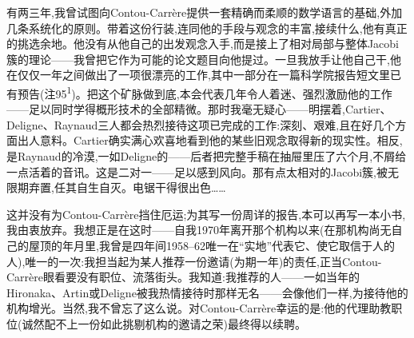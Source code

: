 有两三年,我曾试图向Contou-Carrère提供一套精确而柔顺的数学语言的基础,外加几条系统化的原则。带着这份行装,连同他的手段与观念的丰富,接续什么,他有真正的挑选余地。他没有从他自己的出发观念入手,而是接上了相对局部与整体Jacobi簇的理论——我曾把它作为可能的论文题目向他提过。一旦我放手让他自己干,他在仅仅一年之间做出了一项很漂亮的工作,其中一部分在一篇科学院报告短文里已有预告(注95\textsuperscript{1})。把这个矿脉做到底,本会代表几年令人着迷、强烈激励他的工作——足以同时学得概形技术的全部精微。那时我毫无疑心——明摆着,Cartier、Deligne、Raynaud三人都会热烈接待这项已完成的工作:深刻、艰难,且在好几个方面出人意料。Cartier确实满心欢喜地看到他的某些旧观念取得新的现实性。相反,是Raynaud的冷漠,一如Deligne的——后者把完整手稿在抽屉里压了六个月,不屑给一点活着的音讯。这是二对一——足以感到风向。那有点太相对的Jacobi簇,被无限期弃置,任其自生自灭。电锯干得很出色……

这并没有为Contou-Carrère挡住厄运;为其写一份周详的报告,本可以再写一本小书,我由衷放弃。我想正是在这时——自我1970年离开那个机构以来(在那机构尚无自己的屋顶的年月里,我曾是四年间1958--62唯一在“实地”代表它、使它取信于人的人\dmark{}),唯一的一次:我担当起为某人推荐一份邀请(为期一年)的责任,正当Contou-Carrère眼看要没有职位、流落街头。我知道:我推荐的人——一如当年的Hironaka、Artin或Deligne被我热情接待时那样无名——会像他们一样,为接待他的机构增光。当然,我不曾忘了这么说。对Contou-Carrère幸运的是:他的代理助教职位(诚然配不上一份如此挑剔机构的邀请之荣)最终得以续聘。

